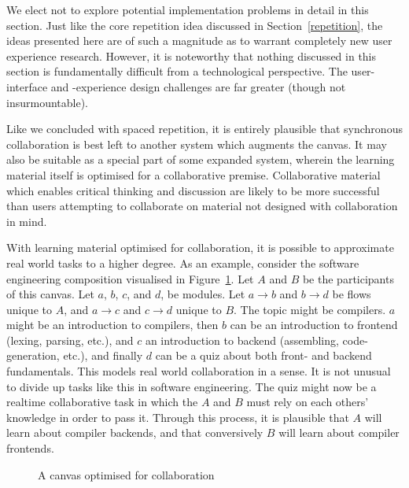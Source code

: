 \documentclass{article}
\begin{document}
\begin{multicols}{2}
We elect not to explore potential implementation problems in detail in this 
section. Just like the core repetition idea discussed in 
Section~\ref{repetition}, the ideas presented here are of such a magnitude as 
to warrant completely new user experience research. However, it is noteworthy 
that nothing discussed in this section is fundamentally difficult from a 
technological perspective. The user-interface and -experience design 
challenges are far greater (though not insurmountable).

Like we concluded with spaced repetition, it is entirely plausible that 
synchronous collaboration is best left to another system which augments the 
canvas. It may also be suitable as a special part of some expanded system, 
wherein the learning material itself is optimised for a collaborative premise. 
Collaborative material which enables critical thinking and discussion are 
likely to be more successful than users attempting to collaborate on material 
not designed with collaboration in mind.

With learning material optimised for collaboration, it is possible to 
approximate real world tasks to a higher degree. As an example, consider the 
software engineering composition visualised in Figure~\ref{collabcanvas}. Let 
$A$ and $B$ be the participants of this canvas. Let $a$, $b$, $c$, and $d$, be 
modules. Let $a \to b$ and $b \to d$ be flows unique to $A$, and $a \to c$ and 
$c \to d$ unique to $B$. The topic might be compilers. $a$ might be an 
introduction to compilers, then $b$ can be an introduction to frontend 
(lexing, parsing, etc.), and $c$ an introduction to backend (assembling, 
code-generation, etc.), and finally $d$ can be a quiz about both front- and 
backend fundamentals. This models real world collaboration in a sense. It is 
not unusual to divide up tasks like this in software engineering. The quiz 
might now be a realtime collaborative task in which the $A$ and $B$ must rely 
on each others' knowledge in order to pass it. Through this process, it is 
plausible that $A$ will learn about compiler backends, and that conversively 
$B$ will learn about compiler frontends.

\begin{figure}[H]
\begin{centering}
\caption{A canvas optimised for collaboration}
\label{collabcanvas}
\end{centering}
\end{figure}


\end{multicols}
\end{document}
